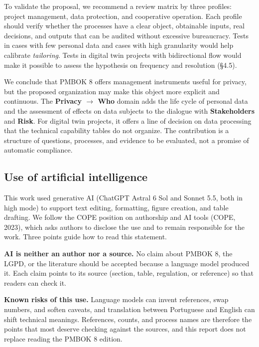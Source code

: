 \documentclass[12pt,a4paper,article,oneside,brazil,english]{abntex2}
\newif\ifavisofinal  \avisofinaltrue    %
\begin{document}
To validate the proposal, we recommend a review matrix by three profiles: project management, data protection, and cooperative operation. Each profile should verify whether the processes have a clear object, obtainable inputs, real decisions, and outputs that can be audited without excessive bureaucracy. Tests in cases with few personal data and cases with high granularity would help calibrate \textit{tailoring}. Tests in digital twin projects with bidirectional flow would make it possible to assess the hypothesis on frequency and resolution (§4.5).

We conclude that PMBOK 8 offers management instruments useful for privacy, but the proposed organization may make this object more explicit and continuous. The \textbf{Privacy \ensuremath{\rightarrow} Who} domain adds the life cycle of personal data and the assessment of effects on data subjects to the dialogue with \textbf{Stakeholders} and \textbf{Risk}. For digital twin projects, it offers a line of decision on data processing that the technical capability tables do not organize. The contribution is a structure of questions, processes, and evidence to be evaluated, not a promise of automatic compliance.

\ifavisofinal
\subsection{Use of artificial intelligence}

This work used generative AI (ChatGPT Astral 6 Sol and Sonnet 5.5, both in high mode) to support text editing, formatting, figure creation, and table drafting. We follow the COPE position on authorship and AI tools (COPE, 2023), which asks authors to disclose the use and to remain responsible for the work. Three points guide how to read this statement.

\textbf{AI is neither an author nor a source.} No claim about PMBOK 8, the LGPD, or the literature should be accepted because a language model produced it. Each claim points to its source (section, table, regulation, or reference) so that readers can check it.

\textbf{Known risks of this use.} Language models can invent references, swap numbers, and soften caveats, and translation between Portuguese and English can shift technical meanings. References, counts, and process names are therefore the points that most deserve checking against the sources, and this report does not replace reading the PMBOK 8 edition.
\end{document}
